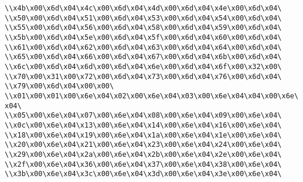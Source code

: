 \verb|\\x4b\x00\x6d\x04\x4c\x00\x6d\x04\x4d\x00\x6d\x04\x4e\x00\x6d\x04\|\newline
\verb|\\x50\x00\x6d\x04\x51\x00\x6d\x04\x53\x00\x6d\x04\x54\x00\x6d\x04\|\newline
\verb|\\x55\x00\x6d\x04\x56\x00\x6d\x04\x58\x00\x6d\x04\x59\x00\x6d\x04\|\newline
\verb|\\x5b\x00\x6d\x04\x5e\x00\x6d\x04\x5f\x00\x6d\x04\x60\x00\x6d\x04\|\newline
\verb|\\x61\x00\x6d\x04\x62\x00\x6d\x04\x63\x00\x6d\x04\x64\x00\x6d\x04\|\newline
\verb|\\x65\x00\x6d\x04\x66\x00\x6d\x04\x67\x00\x6d\x04\x6b\x00\x6d\x04\|\newline
\verb|\\x6c\x00\x6d\x04\x6d\x00\x6d\x04\x6e\x00\x6d\x04\x6f\x00\x32\x00\|\newline
\verb|\\x70\x00\x31\x00\x72\x00\x6d\x04\x73\x00\x6d\x04\x76\x00\x6d\x04\|\newline
\verb|\\x79\x00\x6d\x04\x00\x00\|\newline
\verb|\\x01\x00\x01\x00\x6e\x04\x02\x00\x6e\x04\x03\x00\x6e\x04\x04\x00\x6e\x04\|\newline
\verb|\\x05\x00\x6e\x04\x07\x00\x6e\x04\x08\x00\x6e\x04\x09\x00\x6e\x04\|\newline
\verb|\\x0c\x00\x6e\x04\x13\x00\x6e\x04\x14\x00\x6e\x04\x16\x00\x6e\x04\|\newline
\verb|\\x18\x00\x6e\x04\x19\x00\x6e\x04\x1a\x00\x6e\x04\x1e\x00\x6e\x04\|\newline
\verb|\\x20\x00\x6e\x04\x21\x00\x6e\x04\x23\x00\x6e\x04\x24\x00\x6e\x04\|\newline
\verb|\\x29\x00\x6e\x04\x2a\x00\x6e\x04\x2b\x00\x6e\x04\x2e\x00\x6e\x04\|\newline
\verb|\\x2f\x00\x6e\x04\x36\x00\x6e\x04\x37\x00\x6e\x04\x38\x00\x6e\x04\|\newline
\verb|\\x3b\x00\x6e\x04\x3c\x00\x6e\x04\x3d\x00\x6e\x04\x3e\x00\x6e\x04\|\newline

